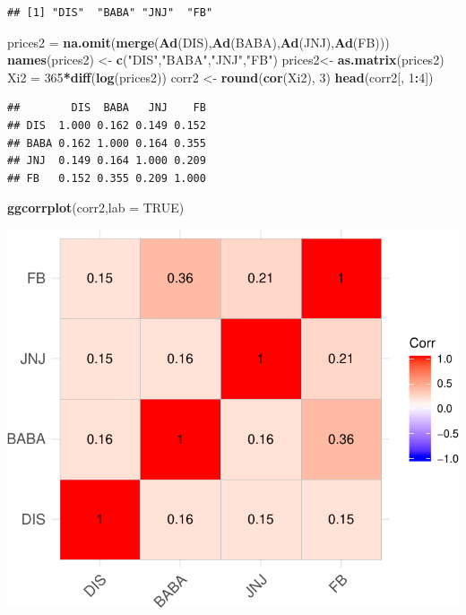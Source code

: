 \documentclass[]{article}
\newenvironment{Shaded}{\begin{snugshade}}{\end{snugshade}}
\newcommand{\KeywordTok}[1]{\textcolor[rgb]{0.13,0.29,0.53}{\textbf{#1}}}
\newcommand{\DataTypeTok}[1]{\textcolor[rgb]{0.13,0.29,0.53}{#1}}
\newcommand{\DecValTok}[1]{\textcolor[rgb]{0.00,0.00,0.81}{#1}}
\newcommand{\StringTok}[1]{\textcolor[rgb]{0.31,0.60,0.02}{#1}}
\newcommand{\OtherTok}[1]{\textcolor[rgb]{0.56,0.35,0.01}{#1}}
\newcommand{\OperatorTok}[1]{\textcolor[rgb]{0.81,0.36,0.00}{\textbf{#1}}}
\newcommand{\NormalTok}[1]{#1}
\begin{document}
\begin{verbatim}
## [1] "DIS"  "BABA" "JNJ"  "FB"
\end{verbatim}

\begin{Shaded}
\begin{Highlighting}[]
\NormalTok{prices2 =}\StringTok{ }\KeywordTok{na.omit}\NormalTok{(}\KeywordTok{merge}\NormalTok{(}\KeywordTok{Ad}\NormalTok{(DIS),}\KeywordTok{Ad}\NormalTok{(BABA),}\KeywordTok{Ad}\NormalTok{(JNJ),}\KeywordTok{Ad}\NormalTok{(FB))) }
\KeywordTok{names}\NormalTok{(prices2) <-}\StringTok{ }\KeywordTok{c}\NormalTok{(}\StringTok{"DIS"}\NormalTok{,}\StringTok{"BABA"}\NormalTok{,}\StringTok{"JNJ"}\NormalTok{,}\StringTok{"FB"}\NormalTok{)}
\NormalTok{prices2<-}\StringTok{ }\KeywordTok{as.matrix}\NormalTok{(prices2)}
\NormalTok{Xi2 =}\StringTok{ }\DecValTok{365}\OperatorTok{*}\KeywordTok{diff}\NormalTok{(}\KeywordTok{log}\NormalTok{(prices2))}
\NormalTok{corr2 <-}\StringTok{ }\KeywordTok{round}\NormalTok{(}\KeywordTok{cor}\NormalTok{(Xi2), }\DecValTok{3}\NormalTok{)}
\KeywordTok{head}\NormalTok{(corr2[, }\DecValTok{1}\OperatorTok{:}\DecValTok{4}\NormalTok{])}
\end{Highlighting}
\end{Shaded}

\begin{verbatim}
##        DIS  BABA   JNJ    FB
## DIS  1.000 0.162 0.149 0.152
## BABA 0.162 1.000 0.164 0.355
## JNJ  0.149 0.164 1.000 0.209
## FB   0.152 0.355 0.209 1.000
\end{verbatim}

\begin{Shaded}
\begin{Highlighting}[]
\KeywordTok{ggcorrplot}\NormalTok{(corr2,}\DataTypeTok{lab =} \OtherTok{TRUE}\NormalTok{)}
\end{Highlighting}
\end{Shaded}

\includegraphics{Markowitz_Research_Me_files/figure-latex/unnamed-chunk-6-1.pdf}
\end{document}
